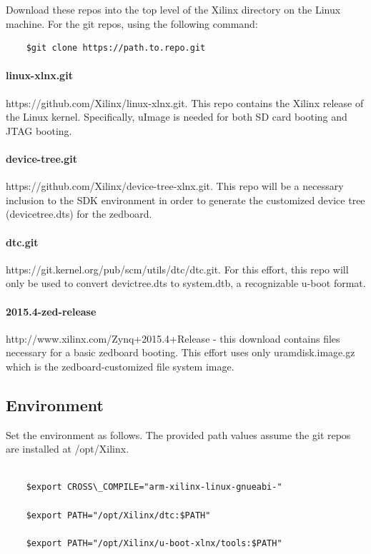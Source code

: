 \documentclass[12pt]{article}
\begin{document}
Download these repos into the top level of the Xilinx directory on the Linux machine.  For the git repos, using the following command:

\begin{lstlisting}
	$git clone https://path.to.repo.git
\end{lstlisting}

\paragraph*{linux-xlnx.git}\label{par:linux-xlnx}https://github.com/Xilinx/linux-xlnx.git.  This repo contains the Xilinx release of the Linux kernel.  Specifically, uImage is needed for both SD card booting and JTAG booting.
\paragraph*{device-tree.git}\label{par:devicetree}https://github.com/Xilinx/device-tree-xlnx.git. This repo will be a necessary inclusion to the SDK environment in order to generate the customized device tree (devicetree.dts) for the zedboard.
\paragraph*{dtc.git}\label{par:dtc}https://git.kernel.org/pub/scm/utils/dtc/dtc.git.  For this effort, this repo will only be used to convert devictree.dts to system.dtb, a recognizable u-boot format.
\paragraph*{2015.4-zed-release}\label{par:zed}http://www.xilinx.com/Zynq+2015.4+Release - this download contains files necessary for a basic zedboard booting.  This effort uses only uramdisk.image.gz which is the zedboard-customized file system image.

\subsection{Environment} 
\label{subsec:environment}
Set the environment as follows.  The provided path values assume the git repos are installed at /opt/Xilinx.
\begin{lstlisting}

	$export CROSS\_COMPILE="arm-xilinx-linux-gnueabi-"

	$export PATH="/opt/Xilinx/dtc:$PATH"

	$export PATH="/opt/Xilinx/u-boot-xlnx/tools:$PATH"
\end{lstlisting}
\end{document}
